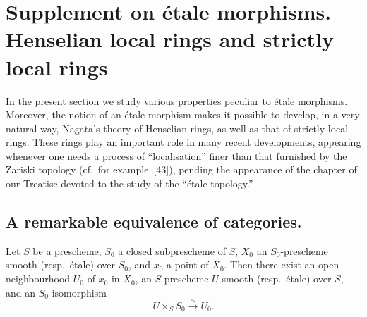 \section{Supplement on \'etale morphisms. Henselian local rings and strictly local rings}
\label{section:IV.18}
\label{IV.18}

In the present section we study various properties peculiar to \'etale morphisms.  Moreover, the notion of an \'etale morphism makes it possible to develop, in a very natural way, Nagata's theory of Henselian rings, as well as that of strictly local rings.  These rings play an important role in many recent developments, appearing whenever one needs a process of ``localisation'' finer than that furnished by the Zariski topology (cf.\ for example~[43]), pending the appearance of the chapter of our Treatise devoted to the study of the ``\'etale topology.''

\subsection{A remarkable equivalence of categories.}
\label{subsection:IV.18.1}

\begin{proposition}[18.1.1]
\label{IV.18.1.1}
Let $S$ be a prescheme, $S_0$ a closed subprescheme of $S$, $X_0$ an $S_0$-prescheme smooth (resp.\ \'etale) over $S_0$, and $x_0$ a point of $X_0$.  Then there exist an open neighbourhood $U_0$ of $x_0$ in $X_0$, an $S$-prescheme $U$ smooth (resp.\ \'etale) over $S$, and an $S_0$-isomorphism
\[
 U\times_SS_0\xrightarrow{\sim}U_0.
\]
\end{proposition}

